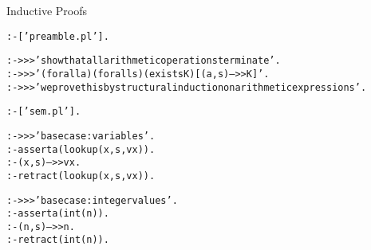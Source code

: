 \documentclass{beamer}
\begin{document}
\begin{frame}[fragile]{Inductive Proofs}
\tiny
\begin{alltt}
% proof-aexp-induction.pl

:- ['preamble.pl'].

:- >>> 'show that all arithmetic operations terminate'.
:- >>> '  (forall a)(forall s)(exists K)[(a,s)-->>K]'.
:- >>> 'we prove this by structural induction on arithmetic expressions'.

% load semantics
:- ['sem.pl'].

:- >>> 'base case: variables'.
%%% assumption: lookup will always produce a value
:- asserta(lookup(x,s,vx)).                                                                     
%%% proof                                                                                       
:- (x,s)-->>vx.                                                                                 
%%% clean up                                                                                    
:- retract(lookup(x,s,vx)).                                                                     
                                                                                                
:- >>> 'base case: integer values'.                                                             
%%% assumption: n is an integer                                                                 
:- asserta(int(n)).                                                                             
%%% proof                                                                                       
:- (n,s)-->>n.                                                                                  
%%% clean up                                                                                    
:- retract(int(n)).                                                                             
\end{alltt}
\end{frame}
\end{document}
